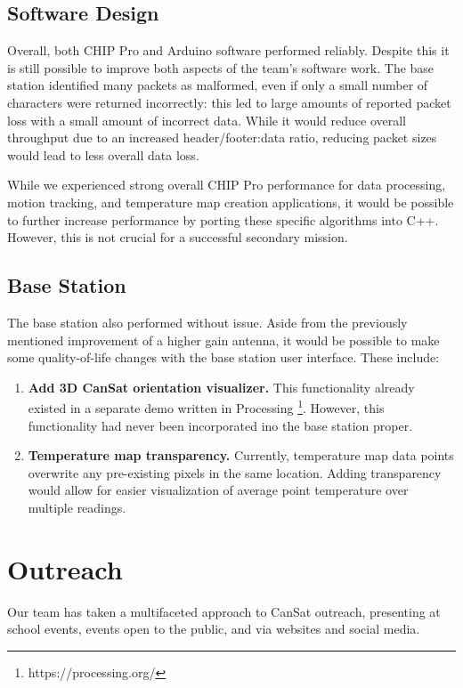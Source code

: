 \documentclass[]{report}
\begin{document}
	\section{Software Design}
	
	Overall, both CHIP Pro and Arduino software performed reliably. Despite this it is still possible to improve both aspects of the team's software work. The base station identified many packets as malformed, even if only a small number of characters were returned incorrectly: this led to large amounts of reported packet loss with a small amount of incorrect data. While it would reduce overall throughput due to an increased header/footer:data ratio, reducing packet sizes would lead to less overall data loss.
	
	While we experienced strong overall CHIP Pro performance for data processing, motion tracking, and temperature map creation applications, it would be possible to further increase performance by porting these specific algorithms into C++. However, this is not crucial for a successful secondary mission.
	
	\section{Base Station}
	
	The base station also performed without issue. Aside from the previously mentioned improvement of a higher gain antenna, it would be possible to make some quality-of-life changes with the base station user interface. These include:
	
	\begin{enumerate}
		\item \textbf{Add 3D CanSat orientation visualizer.} This functionality already existed in a separate demo written in Processing \footnote{https://processing.org/}. However, this functionality had never been incorporated ino the base station proper. \\
		\item \textbf{Temperature map transparency.} Currently, temperature map data points overwrite any pre-existing pixels in the same location. Adding transparency would allow for easier visualization of average point temperature over multiple readings.
	\end{enumerate}
	
	
	\chapter{Outreach}
	Our team has taken a multifaceted approach to CanSat outreach, presenting at school events, events open to the public, and via websites and social media.
\end{document}
